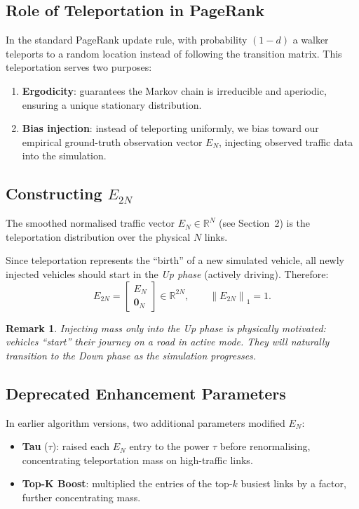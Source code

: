\documentclass[12pt,a4paper]{article}
\theoremstyle{definition}
\theoremstyle{plain}
\newtheorem{remark}{Remark}[section]
\newcommand{\norm}[1]{\left\|#1\right\|}
\begin{document}
\subsection{Role of Teleportation in PageRank}

In the standard PageRank update rule, with probability $(1-d)$ a walker teleports to a
random location instead of following the transition matrix. This teleportation serves two
purposes:
\begin{enumerate}
  \item \textbf{Ergodicity}: guarantees the Markov chain is irreducible and aperiodic,
    ensuring a unique stationary distribution.
  \item \textbf{Bias injection}: instead of teleporting uniformly, we bias toward our
    empirical ground-truth observation vector $E_N$, injecting observed traffic data into
    the simulation.
\end{enumerate}

\subsection{Constructing $E_{2N}$}

The smoothed normalised traffic vector $E_N \in \mathbb{R}^N$ (see Section~2) is the
teleportation distribution over the physical $N$ links.

Since teleportation represents the ``birth'' of a new simulated vehicle, all newly
injected vehicles should start in the \emph{Up phase} (actively driving). Therefore:
\begin{equation}
  \boxed{E_{2N} = \begin{bmatrix} E_N \\ \mathbf{0}_N \end{bmatrix}}
  \in \mathbb{R}^{2N}, \qquad \norm{E_{2N}}_1 = 1.
\end{equation}

\begin{remark}
  Injecting mass only into the Up phase is physically motivated: vehicles ``start''
  their journey on a road in active mode. They will naturally transition to the Down phase
  as the simulation progresses.
\end{remark}

\subsection{Deprecated Enhancement Parameters}

In earlier algorithm versions, two additional parameters modified $E_N$:
\begin{itemize}
  \item \textbf{Tau} ($\tau$): raised each $E_N$ entry to the power $\tau$ before
    renormalising, concentrating teleportation mass on high-traffic links.
  \item \textbf{Top-K Boost}: multiplied the entries of the top-$k$ busiest links by a
    factor, further concentrating mass.
\end{itemize}
\end{document}
